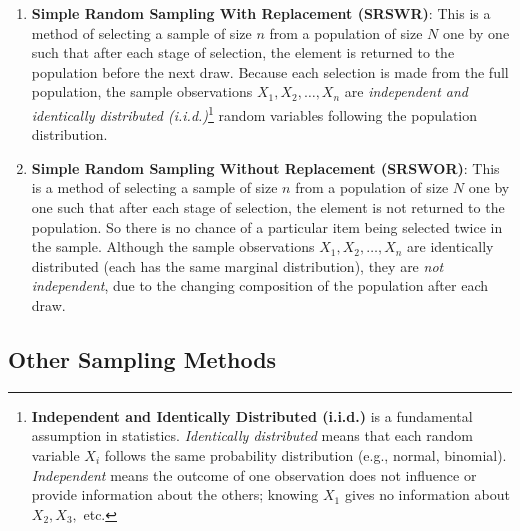 \documentclass[twoside]{book}
\begin{document}
\begin{enumerate}
    \item \textbf{Simple Random Sampling With Replacement (SRSWR)}: This is a method of selecting a sample of size \( n \) from a population of size \( N \) one by one such that after each stage of selection, the element is returned to the population before the next draw. Because each selection is made from the full population, the sample observations \( X_1, X_2, \dots, X_n \) are \textit{independent and identically distributed (i.i.d.)}\footnote{%
    \textbf{Independent and Identically Distributed (i.i.d.)} is a fundamental assumption in statistics. \textit{Identically distributed} means that each random variable \( X_i \) follows the same probability distribution (e.g., normal, binomial). \textit{Independent} means the outcome of one observation does not influence or provide information about the others; knowing \( X_1 \) gives no information about \( X_2, X_3, \) etc.
} random variables following the population distribution.
    
    \item \textbf{Simple Random Sampling Without Replacement (SRSWOR)}: This is a method of selecting a sample of size \( n \) from a population of size \( N \) one by one such that after each stage of selection, the element is not returned to the population. So there is no chance of a particular item being selected twice in the sample. Although the sample observations \( X_1, X_2, \dots, X_n \) are identically distributed (each has the same marginal distribution), they are \textit{not independent}, due to the changing composition of the population after each draw.
\end{enumerate}


\subsection{Other Sampling Methods}
\end{document}
